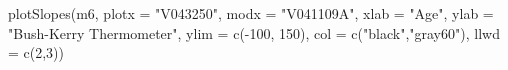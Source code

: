 \begin{Schunk}
\begin{Sinput}
 plotSlopes(m6, plotx = "V043250", modx = "V041109A", xlab = "Age", ylab = "Bush-Kerry Thermometer", ylim = c(-100, 150), col = c("black","gray60"), llwd = c(2,3))
\end{Sinput}
\end{Schunk}
